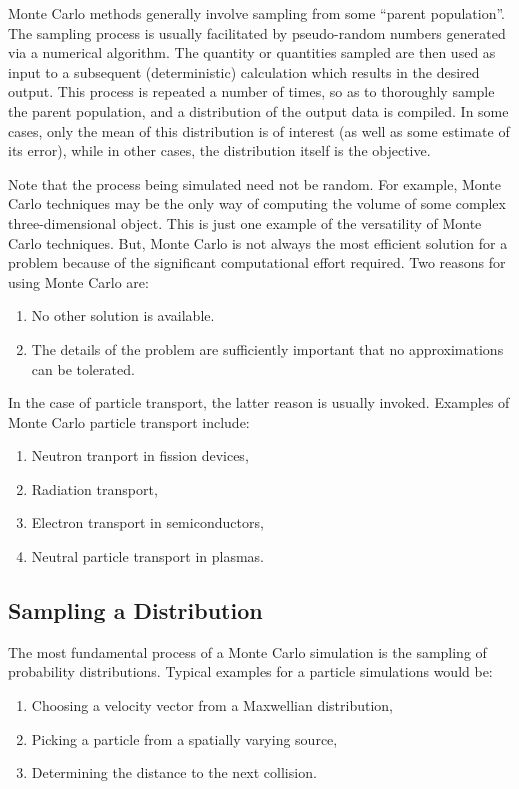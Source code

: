 \documentclass[12pt]{report}
\begin{document}
Monte Carlo methods generally involve sampling from some ``parent population''.
The sampling process is usually facilitated by pseudo-random numbers generated
via a numerical algorithm. The quantity or quantities sampled are then 
used as input to a subsequent (deterministic) calculation which results in the
desired output. This process is repeated a number of times, so as to 
thoroughly sample the parent population, and a distribution of the output
data is compiled. In some cases, only the mean of this distribution is of 
interest (as well as some estimate of its error), while in other cases, the
distribution itself is the objective.

Note that the process being simulated need not be random. For example, Monte
Carlo techniques may be the only way of computing the volume of some complex
three-dimensional object. This is just one example of the versatility of
Monte Carlo techniques. But, Monte Carlo is not always the most efficient
solution for a problem because of the significant computational
effort required. Two reasons for using Monte Carlo are: 
\begin{enumerate}
\item No other solution is available.
\item The details of the problem are sufficiently important that no 
approximations
can be tolerated.
\end{enumerate}

In the case of particle transport, the latter reason is usually invoked.
Examples of Monte Carlo particle transport include:
\begin{enumerate}
\item Neutron tranport in fission devices,
\item Radiation transport,
\item Electron transport in semiconductors,
\item Neutral particle transport in plasmas.
\end{enumerate}

\subsection{Sampling a Distribution}

The most fundamental process of a Monte Carlo simulation is the sampling
of probability distributions. Typical examples for a particle simulations
would be:
\begin{enumerate}
\item Choosing a velocity vector from a Maxwellian distribution,
\item Picking a particle from a spatially varying source,
\item Determining the distance to the next collision.
\end{enumerate}
\end{document}
